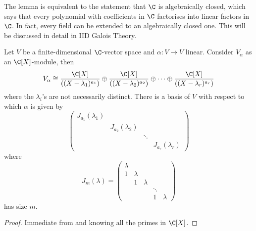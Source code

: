 \documentclass[a4paper]{article}
\begin{document}
\begin{remark}
  The lemma is equivalent to the statement that \(\C\) is algebraically closed, which says that every polynomial with coefficients in \(\C\) factorises into linear factors in \(\C\). In fact, every field can be extended to an algebraically closed one. This will be discussed in detail in IID Galois Theory.
\end{remark}

\begin{theorem}
  Let \(V\) be a finite-dimensional \(\C\)-vector space and \(\alpha:V \to V\) linear. Consider \(V_\alpha\) as an \(\C[X]\)-module, then
  \[
    V_\alpha \cong \frac{\C[X]}{((X - \lambda_1)^{a_1})} \oplus \frac{\C[X]}{((X - \lambda_2)^{a_2})} \oplus \dots \oplus \frac{\C[X]}{((X - \lambda_r)^{a_r})}
    \]
    where the \(\lambda_i\)'s are not necessarily distinct. There is a basis of \(V\) with respect to which \(\alpha\) is given by
    \[
      \begin{pmatrix}
        J_{a_1}(\lambda_1) \\
        & J_{a_2}(\lambda_2) \\
        & & \ddots \\
        & & & J_{a_r}(\lambda_r)
      \end{pmatrix}
    \]
    where
    \[
      J_m(\lambda) =
      \begin{pmatrix}
        \lambda \\
        1 & \lambda \\
        & 1 & \lambda \\
        & & & \ddots \\
        & & & 1 & \lambda
      \end{pmatrix}
    \]
    has size \(m\).
\end{theorem}

\begin{proof}
  Immediate from  and knowing all the primes in \(\C[X]\).
\end{proof}
\end{document}
